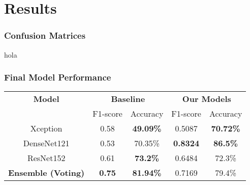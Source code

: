 \section{Results}
\label{sec:results}

\begin{frame}
    \frametitle{Confusion Matrices}
    hola
\end{frame}

\begin{frame}
    \frametitle{Final Model Performance}
    \begin{center}
        \renewcommand{\arraystretch}{1.2}
        \begin{tabular}{|c|c|c|c|c|}
            \hline
            \textbf{Model} & \multicolumn{2}{c|}{\textbf{Baseline}} & \multicolumn{2}{c|}{\textbf{Our Models}} \\
            \cline{2-5}
            & F1-score & Accuracy & F1-score & Accuracy \\
            \hline
            Xception & 0.58 & \textbf{49.09\%} & 0.5087 & \textbf{70.72\%} \\
            DenseNet121 & 0.53 & 70.35\% & \textbf{0.8324} & \textbf{86.5\%} \\
            ResNet152 & 0.61 & \textbf{73.2\%} & 0.6484 & 72.3\% \\
            \hline
            \textbf{Ensemble (Voting)} & \textbf{0.75} & \textbf{81.94\%} & 0.7169 & 79.4\% \\
            \hline
        \end{tabular}
    \end{center}
\end{frame}
